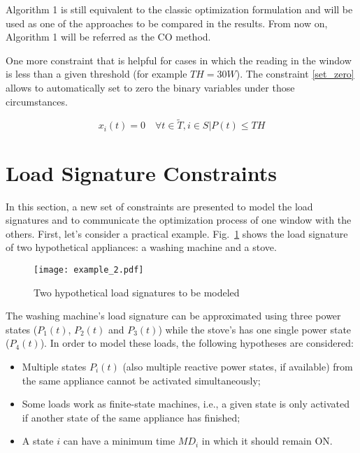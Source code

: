 Algorithm 1 is still equivalent to the classic optimization formulation and will be used as one of the approaches to be compared in the results. From now on, Algorithm 1 will be referred as the CO method. 

One more constraint that is helpful for cases in which the reading in the window is less than a given threshold (for example $TH = 30W$). The constraint \eqref{set_zero} allows to automatically set to zero the binary variables under those circumstances. 

\begin{equation} \label{set_zero}
   x_i(t) = 0 \quad \forall t \in \tilde{T}, i \in S | P(t) \leq TH
\end{equation}

\section{Load Signature Constraints}

In this section, a new set of constraints are presented to model the load signatures and to communicate the optimization process of one window with the others. First, let's consider a practical example. Fig.~\ref{example} shows the load signature of two hypothetical appliances: a washing machine and a stove.

\begin{figure}[tb]
    \centering
    \texttt{[image: example\_2.pdf]}
    \caption{Two hypothetical load signatures to be modeled}
    \label{example}
\end{figure}

The washing machine's load signature can be approximated using three power states ($P_1(t)$, $P_2(t)$ and $P_3(t)$) while the stove's has one single power state ($P_4(t)$). In order to model these loads, the following hypotheses are considered: 

\begin{itemize}

\item Multiple states $P_i(t)$ (also multiple reactive power states, if available) from the same appliance cannot be activated simultaneously;
\item Some loads work as finite-state machines, i.e., a given state is only activated if another state of the same appliance has finished;
\item A state $i$ can have a minimum time $MD_i$ in which it should remain ON.

\end{itemize}

